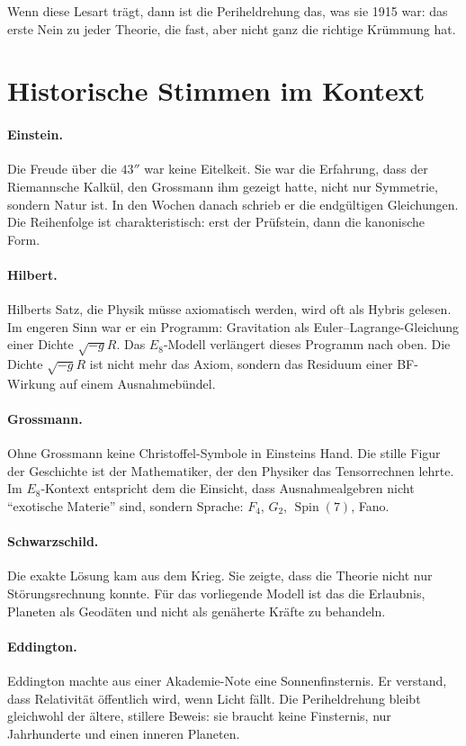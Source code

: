 \documentclass[11pt,a4paper]{article}
\theoremstyle{definition}
\theoremstyle{remark}
\begin{document}
Wenn diese Lesart trägt, dann ist die Periheldrehung das, was sie 1915 war: das erste Nein zu jeder Theorie, die fast, aber nicht ganz die richtige Krümmung hat.

\section{Historische Stimmen im Kontext}

\paragraph{Einstein.}
Die Freude über die \(43''\) war keine Eitelkeit. Sie war die Erfahrung, dass der Riemannsche Kalkül, den Grossmann ihm gezeigt hatte, nicht nur Symmetrie, sondern Natur ist. In den Wochen danach schrieb er die endgültigen Gleichungen. Die Reihenfolge ist charakteristisch: erst der Prüfstein, dann die kanonische Form.

\paragraph{Hilbert.}
Hilberts Satz, die Physik müsse axiomatisch werden, wird oft als Hybris gelesen. Im engeren Sinn war er ein Programm: Gravitation als Euler--Lagrange-Gleichung einer Dichte \(\sqrt{-g}R\). Das \(E_8\)-Modell verlängert dieses Programm nach oben. Die Dichte \(\sqrt{-g}R\) ist nicht mehr das Axiom, sondern das Residuum einer BF-Wirkung auf einem Ausnahmebündel.

\paragraph{Grossmann.}
Ohne Grossmann keine Christoffel-Symbole in Einsteins Hand. Die stille Figur der Geschichte ist der Mathematiker, der den Physiker das Tensorrechnen lehrte. Im \(E_8\)-Kontext entspricht dem die Einsicht, dass Ausnahmealgebren nicht \enquote{exotische Materie} sind, sondern Sprache: \(F_4\), \(G_2\), \(\operatorname{Spin}(7)\), Fano.

\paragraph{Schwarzschild.}
Die exakte Lösung kam aus dem Krieg. Sie zeigte, dass die Theorie nicht nur Störungsrechnung konnte. Für das vorliegende Modell ist das die Erlaubnis, Planeten als Geodäten und nicht als genäherte Kräfte zu behandeln.

\paragraph{Eddington.}
Eddington machte aus einer Akademie-Note eine Sonnenfinsternis. Er verstand, dass Relativität öffentlich wird, wenn Licht fällt. Die Periheldrehung bleibt gleichwohl der ältere, stillere Beweis: sie braucht keine Finsternis, nur Jahrhunderte und einen inneren Planeten.
\end{document}
